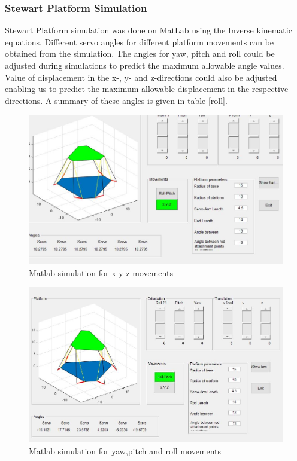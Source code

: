 \subsubsection{Stewart Platform Simulation}
Stewart Platform simulation was done on MatLab using the Inverse kinematic equations. Different servo angles for different platform movements can be obtained from the simulation. The angles for yaw, pitch and roll could be adjusted during simulations to predict the maximum allowable angle values. Value of displacement in the x-, y- and z-directions could also be adjusted enabling us to predict the maximum allowable displacement in the respective directions. A summary of these angles is given in table \ref{roll}.
\begin{center}
	\begin{figure}[H]
	\centering
	\includegraphics[width=0.75\linewidth]{Figures/Matlab}
	\caption[Linear displacements]{Matlab simulation for x-y-z movements}
	\end{figure}
\end{center}
\begin{center}
	\begin{figure}[H]
	\centering
	\includegraphics[width=0.75\linewidth]{Figures/Matlab2}
	\caption[Angular displacements]{Matlab simulation for yaw,pitch and roll movements}
	\end{figure}
\end{center}
